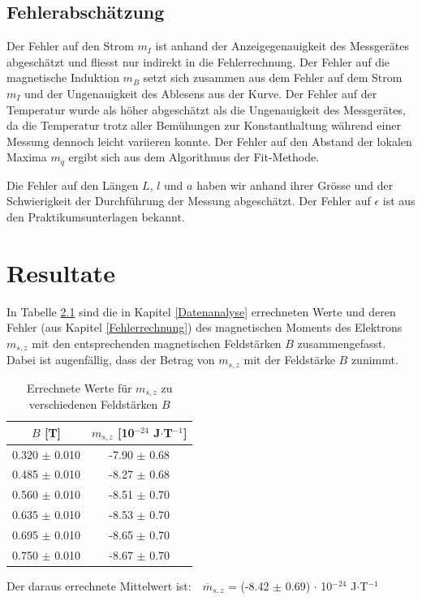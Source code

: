 \documentclass[a4paper,parskip,11pt, DIV12]{scrreprt}
\begin{document}
\section{Fehlerabschätzung}
Der Fehler auf den Strom $m_I$ ist anhand der Anzeigegenauigkeit des Messgerätes abgeschätzt und fliesst nur indirekt in die Fehlerrechnung. Der Fehler auf die magnetische Induktion $m_B$ setzt sich zusammen aus dem Fehler auf dem Strom $m_I$ und der Ungenauigkeit des Ablesens aus der Kurve. Der Fehler auf der Temperatur wurde als höher abgeschätzt als die Ungenauigkeit des Messgerätes, da die Temperatur trotz aller Bemühungen zur Konstanthaltung während einer Messung dennoch leicht variieren konnte. Der Fehler auf den Abstand der lokalen Maxima $m_q$ ergibt sich aus dem Algorithmus der Fit-Methode.

Die Fehler auf den Längen $L$, $l$ und $a$ haben wir anhand ihrer Grösse und der Schwierigkeit der Durchführung der Messung abgeschätzt. Der Fehler auf $\epsilon$ ist aus den Praktikumsunterlagen bekannt.
\clearpage

\chapter{Resultate}
In Tabelle \ref{tabelle2} sind die in Kapitel \ref{Datenanalyse} errechneten Werte und deren Fehler (aus Kapitel \ref{Fehlerrechnung}) des magnetischen Moments des Elektrons $m_{s,z}$ mit den entsprechenden magnetischen Feldstärken $B$ zusammengefasst. Dabei ist augenfällig, dass der Betrag von $m_{s,z}$ mit der Feldstärke $B$ zunimmt.\\

\begin{table}[H]
\centering
\renewcommand{\arraystretch}{1.2} %
\setlength{\tabcolsep}{3mm} %
\begin{tabular}{|c|c|}
$B$ [T] & $m_{s,z}$ [10$^{-24}$ J$\cdot$T$^{-1}$] \\ \hline
0.320 $\pm$ 0.010 & -7.90 $\pm$ 0.68\\
0.485 $\pm$ 0.010 & -8.27 $\pm$ 0.68\\
0.560 $\pm$ 0.010 & -8.51 $\pm$ 0.70\\
0.635 $\pm$ 0.010 & -8.53 $\pm$ 0.70\\
0.695 $\pm$ 0.010 & -8.65 $\pm$ 0.70\\
0.750 $\pm$ 0.010 & -8.67 $\pm$ 0.70\\
\end{tabular}
\caption[Resultate]{Errechnete Werte für $m_{s,z}$ zu verschiedenen Feldstärken $B$}\label{tabelle2}
\end{table} Der daraus errechnete Mittelwert ist:$\quad \overline{m}_{s,z}$ = (-8.42 $\pm$ 0.69) $\cdot$ 10$^{-24}$ J$\cdot$T$^{-1}$
\end{document}
